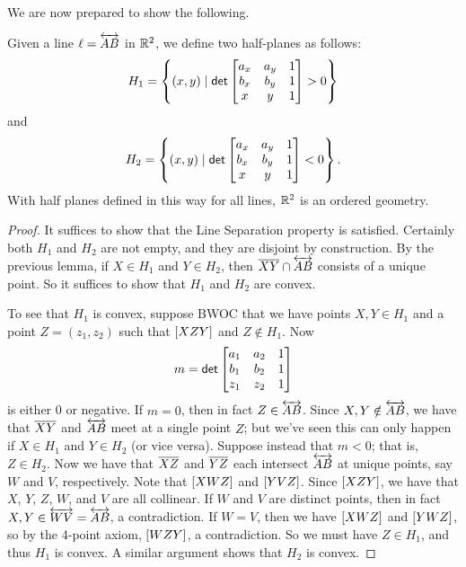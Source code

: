 We are now prepared to show the following.

\begin{prop}
Given a line \(\ell = \overleftrightarrow{AB}\) in \(\mathbb{R}^2\), we define two half-planes as follows: \[ H_1 = \left\{ (x, y) \mid \mathsf{det} \begin{bmatrix} a_x & a_y & 1 \\ b_x & b_y & 1 \\ x & y & 1 \end{bmatrix} > 0 \right\} \] and \[ H_2 = \left\{ (x, y) \mid \mathsf{det} \begin{bmatrix} a_x & a_y & 1 \\ b_x & b_y & 1 \\ x & y & 1 \end{bmatrix} < 0 \right\}. \]
With half planes defined in this way for all lines, \(\mathbb{R}^2\) is an ordered geometry.
\end{prop}

\begin{proof}
It suffices to show that the Line Separation property is satisfied.
Certainly both \(H_1\) and \(H_2\) are not empty, and they are disjoint by construction.
By the previous lemma, if \(X \in H_1\) and \(Y \in H_2\), then \(\overline{XY} \cap \overleftrightarrow{AB}\) consists of a unique point. So it suffices to show that \(H_1\) and \(H_2\) are convex.

To see that \(H_1\) is convex, suppose BWOC that we have points \(X,Y \in H_1\) and a point \(Z = (z_1, z_2)\) such that \([ X Z Y ]\) and \(Z \notin H_1\).
Now \[ m = \mathsf{det} \begin{bmatrix} a_1 & a_2 & 1 \\ b_1 & b_2 & 1 \\ z_1 & z_2 & 1 \end{bmatrix} \] is either 0 or negative.
If \(m = 0\), then in fact \(Z \in \overleftrightarrow{AB}\).
Since \(X,Y \notin \overleftrightarrow{AB}\), we have that \(\overline{XY}\) and \(\overleftrightarrow{AB}\) meet at a single point \(Z\); but we've seen this can only happen if \(X \in H_1\) and \(Y \in H_2\) (or vice versa).
Suppose instead that \(m < 0\); that is, \(Z \in H_2\).
Now we have that \(\overline{XZ}\) and \(\overline{YZ}\) each intersect \(\overleftrightarrow{AB}\) at unique points, say \(W\) and \(V\), respectively.
Note that \([ X W Z ]\) and \([ Y V Z ]\).
Since \([ X Z Y ]\), we have that \(X\), \(Y\), \(Z\), \(W\), and \(V\) are all collinear.
If \(W\) and \(V\) are distinct points, then in fact \(X, Y \in \overleftrightarrow{WV} = \overleftrightarrow{AB}\), a contradiction.
If \(W = V\), then we have \([ X W Z ]\) and \([ Y W Z ]\), so by the 4-point axiom, \([ W Z Y ]\), a contradiction.
So we must have \(Z \in H_1\), and thus \(H_1\) is convex.
A similar argument shows that \(H_2\) is convex.
\end{proof}
